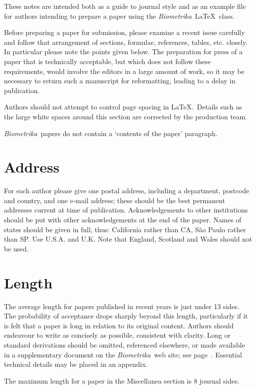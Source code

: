 \documentclass[article,lineno]{biometrika}
\def\Bka{{\it Biometrika}}
\begin{document}
These notes are intended both as a guide to journal style and as an example file for authors intending to prepare a paper using  the \Bka\ \LaTeX\ class.

Before preparing a paper for submission, please examine a recent issue carefully and follow that arrangement of sections, formulae, references, tables, etc. closely. In particular please note the points given below. The preparation for press of a paper that is technically acceptable, but which does not follow these requirements, would involve the editors in a large amount of work, so it may be necessary to return such a manuscript for reformatting, leading to a delay in publication.

Authors should not attempt to control page spacing in \LaTeX.\  Details such as the large white spaces around this section are corrected by the production team.

\Bka\  papers do not contain a `contents of the paper' paragraph.

\section{Address}

For each author please give one postal address, including a department, postcode and country, and one e-mail address; these should be the best permanent addresses current at time of publication. Acknowledgements to other institutions should be put with other acknowledgements at the end of the paper. Names of states should be given in full, thus: California rather than CA, S\~ao Paulo rather than SP. Use U.S.A. and U.K. Note that England, Scotland and Wales should not be used.

\section{Length}

The average length for papers published in recent years is just under 13 sides.  The probability of acceptance drops sharply beyond this length, particularly if it is felt that a paper is long in relation to its original content.  Authors should endeavour to write as concisely as possible,  consistent with clarity.  Long or standard derivations should be omitted, referenced elsewhere, or made available in a supplementary document on the \Bka\ web site; see page~\pageref{SM}.  Essential technical details may be placed in an appendix.

The maximum length for a paper in the Miscellanea section is 8 journal sides.
\end{document}
